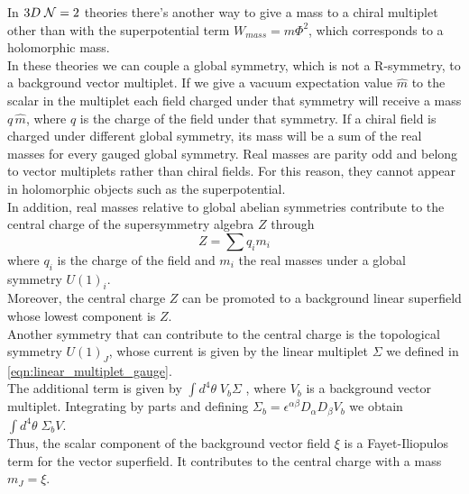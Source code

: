 In $3 D \; \mathcal{N}=2$ theories there's another way to give a mass to a chiral multiplet other than with the superpotential term $W_{mass}= m \Phi^2$, which corresponds to a holomorphic mass.\\
In these theories we can couple a global symmetry, which is not a R-symmetry, to a background vector multiplet.
If we give a vacuum expectation value $\hat{m} $ to the scalar in the multiplet each field charged under that symmetry will receive a mass $q \, \hat{m}$, where $q$ is the charge of the field under that symmetry.
If a chiral field is charged under different global symmetry, its mass will be a sum of the real masses for every gauged global symmetry.
Real masses are parity odd and belong to vector multiplets rather than chiral fields. For this reason, they cannot appear in holomorphic objects such as the superpotential.\\
In addition, real masses relative to global abelian symmetries contribute to the central charge of the supersymmetry algebra $Z$ through
\begin{equation}
  Z = \sum q_i m_i
 \end{equation} 
 where $q_i$ is the charge of the field and $m_i$ the real masses under a global symmetry $U(1)_i$.\\
 Moreover, the central charge $Z$ can be promoted to a background linear superfield whose lowest component is $Z$.\\
 Another symmetry that can contribute to the central charge is the topological symmetry $U(1)_J$, whose current is given by the linear multiplet $\Sigma $ we defined in \eqref{eqn:linear_multiplet_gauge}.\\
 The additional term is given by $\int d^4 \theta \; V_b \Sigma $ , where $V_b$ is a background vector multiplet.
 Integrating by parts and defining  $\Sigma_b = \epsilon^{\alpha \beta} D_{\alpha} D_{\beta} V_b$ we obtain $\int d^4 \theta \; \Sigma_b V  $.\\
 Thus, the scalar component of the background vector field $\xi$ is a Fayet-Iliopulos term for the vector superfield.
 It contributes to the central charge with a mass $ m_J = \xi $.


 













 

